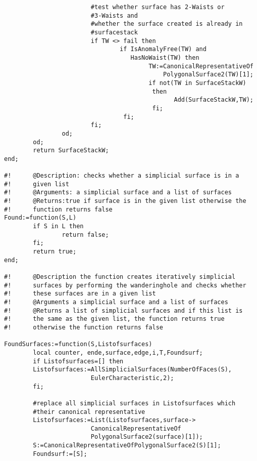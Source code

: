 \documentclass[12pt,titlepage,twoside,cleardoublepage]{article}
\theoremstyle{nummermitklammern}
\numberwithin{equation}{section}
\begin{document}
\begin{linenumbers}
\begin{verbatim}
                        #test whether surface has 2-Waists or 
                        #3-Waists and
                        #whether the surface created is already in
                        #surfacestack
                        if TW <> fail then
                                if IsAnomalyFree(TW) and 
                                   HasNoWaist(TW) then
                                        TW:=CanonicalRepresentativeOf
                                            PolygonalSurface2(TW)[1];
                                        if not(TW in SurfaceStackW) 	
                                         then
                                               Add(SurfaceStackW,TW);
                                         fi;
                                 fi;
                        fi;
                od;
        od;
        return SurfaceStackW;
end;

#!      @Description: checks whether a simplicial surface is in a 
#!      given list
#!      @Arguments: a simplicial surface and a list of surfaces
#!      @Returns:true if surface is in the given list otherwise the
#!      function returns false
Found:=function(S,L)
        if S in L then
                return false;
        fi;
        return true;
end;

#!      @Description the function creates iteratively simplicial 
#!      surfaces by performing the wanderinghole and checks whether 
#!      these surfaces are in a given list
#!      @Arguments a simplicial surface and a list of surfaces
#!      @Returns a list of simplicial surfaces and if this list is 
#!      the same as the given list, the function returns true 
#!      otherwise the function returns false

FoundSurfaces:=function(S,Listofsurfaces)
        local counter, ende,surface,edge,i,T,Foundsurf;
        if Listofsurfaces=[] then
        Listofsurfaces:=AllSimplicialSurfaces(NumberOfFaces(S),
                        EulerCharacteristic,2);
        fi;

        #replace all simplicial surfaces in Listofsurfaces which 
        #their canonical representative
        Listofsurfaces:=List(Listofsurfaces,surface->
                        CanonicalRepresentativeOf
                        PolygonalSurface2(surface)[1]);
        S:=CanonicalRepresentativeOfPolygonalSurface2(S)[1];
        Foundsurf:=[S];


\end{verbatim}
\end{linenumbers}
\end{document}
